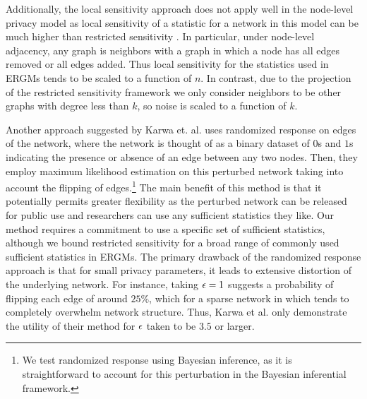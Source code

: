 Additionally, the local sensitivity approach does not apply well in the node-level privacy model as local sensitivity of a statistic for a network in this model can be much higher than restricted sensitivity \cite{BBDS13}. In particular, under node-level adjacency, any graph is neighbors with a graph in which a node has all edges removed or all edges added. Thus local sensitivity for the statistics used in ERGMs tends to be scaled to a function of $n$. In contrast, due to the projection of the restricted sensitivity framework we only consider neighbors to be other graphs with degree less than $k$, so noise is scaled to a function of $k$.

Another approach suggested by Karwa et. al. \cite{KKS17} uses randomized response on edges of the network, where the network is thought of as a binary dataset of $0$s and $1$s indicating the presence or absence of an edge between any two nodes. Then, they employ maximum likelihood estimation on this perturbed network taking into account the flipping of edges.\footnote{We test randomized response using Bayesian inference, as it is straightforward to account for this perturbation in the Bayesian inferential framework.} The main benefit of this method is that it potentially permits greater flexibility as the perturbed network can be released for public use and researchers can use any sufficient statistics they like. Our method requires a commitment to use a specific set of sufficient statistics, although we bound restricted sensitivity for a broad range of commonly used sufficient statistics in ERGMs. The primary drawback of the randomized response approach is that for small privacy parameters, it leads to extensive distortion of the underlying network. For instance, taking $\epsilon =1$ suggests a probability of flipping each edge of around $25\%$, which for a sparse network in which tends to completely overwhelm network structure. Thus, Karwa et al. only demonstrate the utility of their method for $\epsilon$ taken to be $3.5$ or larger.  %



